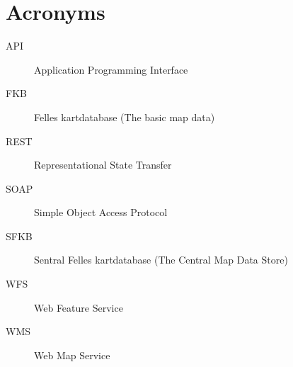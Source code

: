 
\chapter{Acronyms}
\begin{description}
	\item[API] Application Programming Interface
	\item[FKB] Felles kartdatabase (The basic map data)
	\item[REST] Representational State Transfer 
	\item[SOAP] Simple Object Access Protocol
	\item[SFKB] Sentral Felles kartdatabase (The Central Map Data Store)
	\item[WFS] Web Feature Service
	\item[WMS] Web Map Service
\end{description}